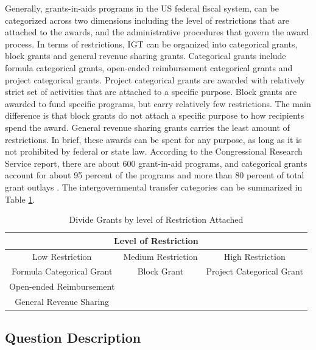 \documentclass[man]{apa7}
\begin{document}
Generally, grants-in-aids programs in the US federal fiscal system, can be categorized across two dimensions including the level of restrictions that are attached to the awards, and the administrative procedures that govern the award process. In terms of restrictions, IGT can be organized into categorical grants, block grants and general revenue sharing grants. Categorical grants include formula categorical grants, open-ended reimbursement categorical grants and project categorical grants. Project categorical grants are awarded with relatively strict set of activities that are attached to a specific purpose. Block grants are awarded to fund specific programs, but carry relatively few restrictions. The main difference is that block grants do not attach a specific purpose to how recipients spend the award. General revenue sharing grants carries the least amount of restrictions. In brief, these awards can be spent for any purpose, as long as it is not prohibited by federal or state law.  According to the Congressional Research Service report, there are about 600 grant-in-aid programs, and categorical grants account for about 95 percent of the programs and more than 80 percent of total grant outlays \parencite{dilger2015federal}. The intergovernmental transfer categories can be summarized in Table \ref*{igtkinds}.

\begin{table}[H]
  \centering
  \caption{Divide Grants by level of Restriction Attached}
  \begin{tabular}{ccc}
    \toprule
    \multicolumn{3}{c}{Level of Restriction}                                   \\
    \midrule
    Low Restriction           & Medium Restriction & High Restriction          \\
    \midrule
    Formula Categorical Grant & Block Grant        & Project Categorical Grant \\
    Open-ended Reimbursement  &                    &                           \\
    General Revenue Sharing   &                    &                           \\
    \bottomrule
  \end{tabular}%
  \label{igtkinds}%
\end{table}%

\subsection{Question Description}
\end{document}
